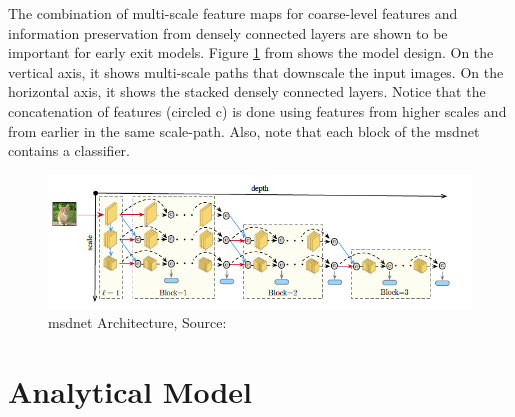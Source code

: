 The combination of multi-scale feature maps for coarse-level features and information preservation from densely connected layers are shown to be important for early exit models. Figure \ref{fig:msdnet} from \cite{huang_multi-scale_2017} shows the model design. On the vertical axis, it shows multi-scale paths that downscale the input images. On the horizontal axis, it shows the stacked densely connected layers. Notice that the concatenation of features (circled c) is done using features from higher scales and from earlier in the same scale-path. Also, note that each block of the \gls{msdnet} contains a classifier.
\begin{figure}
	\centering
	\includegraphics[width=\linewidth]{figures/models/msdnet}
	\caption[\gls{msdnet} Architecture]{\gls{msdnet} Architecture, Source:  \cite{huang_multi-scale_2017}}
	\label{fig:msdnet}
\end{figure}

\newpage\section{Analytical Model} \label{sec:ee-metrics}

